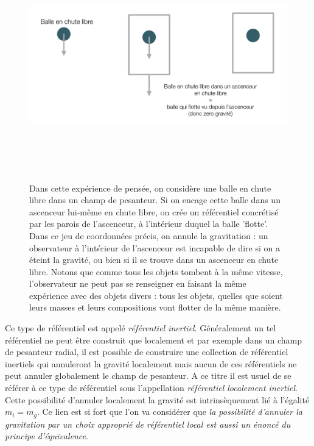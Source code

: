 \begin{figure}[htbp]
	\centering
		\includegraphics[height=10cm]{figs/ascenceur.png}
	\caption[Annulation du champ de pesanteur]{Dans cette expérience de pensée, on considère une balle en chute libre dans un champ de pesanteur. Si on encage cette balle dans un ascenceur lui-même en chute libre, on crée un référentiel concrétisé par les parois de l'ascenceur, à l'intérieur duquel la balle 'flotte'. Dans ce jeu de coordonnées précis, on annule la gravitation : un observateur à l'intérieur de l'ascenceur est incapable de dire si on a éteint la gravité, ou bien si il se trouve dans un ascenceur en chute libre. Notons que comme tous les objets tombent à la même vitesse, l'observateur ne peut pas se renseigner en faisant la même expérience avec des objets divers : tous les objets, quelles que soient leurs masses et leurs compositions vont flotter de la même manière. }
	\label{f:ascenceur}
\end{figure}


Ce type de référentiel est appelé \textit{référentiel inertiel}. Généralement un tel référentiel ne peut être construit que localement et par exemple dans un champ de pesanteur radial, il est possible de construire une collection de référentiel inertiels qui annuleront la gravité localement mais aucun de ces référentiels ne peut annuler globalement le champ de pesanteur. A ce titre il est usuel de se référer à ce type de référentiel sous l'appellation \textit{référentiel localement inertiel}. Cette possibilité d'annuler localement la gravité est intrinsèquement lié à l'égalité $m_i=m_g$. Ce lien est si fort que l'on va considérer que \textit{la possibilité d'annuler la gravitation par un choix approprié de référentiel local est aussi un énoncé du principe d'équivalence}. 

